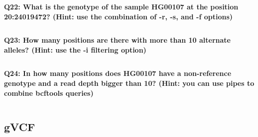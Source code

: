 \documentclass[11pt]{article}
\makeatletter
\newcommand{\boxspacing}{\kern\kvtcb@left@rule\kern\kvtcb@boxsep}
\newcommand{\prompt}[4]{
        {\ttfamily\llap{{\color{#2}[#3]:\hspace{3pt}#4}}\vspace{-\baselineskip}}
    }
\makeatother
\begin{document}
    \begin{tcolorbox}[breakable, size=fbox, boxrule=1pt, pad at break*=1mm,colback=cellbackground, colframe=cellborder]
\prompt{In}{incolor}{ }{\boxspacing}
\begin{Verbatim}[commandchars=\\\{\}]

\end{Verbatim}
\end{tcolorbox}

    \textbf{Q22: What is the genotype of the sample HG00107 at the position
20:24019472? (Hint: use the combination of -r, -s, and -f options)}

    \begin{tcolorbox}[breakable, size=fbox, boxrule=1pt, pad at break*=1mm,colback=cellbackground, colframe=cellborder]
\prompt{In}{incolor}{ }{\boxspacing}
\begin{Verbatim}[commandchars=\\\{\}]

\end{Verbatim}
\end{tcolorbox}

    \textbf{Q23: How many positions are there with more than 10 alternate
alleles? (Hint: use the -i filtering option)}

    \begin{tcolorbox}[breakable, size=fbox, boxrule=1pt, pad at break*=1mm,colback=cellbackground, colframe=cellborder]
\prompt{In}{incolor}{ }{\boxspacing}
\begin{Verbatim}[commandchars=\\\{\}]

\end{Verbatim}
\end{tcolorbox}

    \textbf{Q24: In how many positions does HG00107 have a non-reference
genotype and a read depth bigger than 10? (Hint: you can use pipes to
combine bcftools queries)}

    \begin{tcolorbox}[breakable, size=fbox, boxrule=1pt, pad at break*=1mm,colback=cellbackground, colframe=cellborder]
\prompt{In}{incolor}{ }{\boxspacing}
\begin{Verbatim}[commandchars=\\\{\}]

\end{Verbatim}
\end{tcolorbox}

    \hypertarget{gvcf}{%
\subsection{gVCF}\label{gvcf}}
\end{document}
